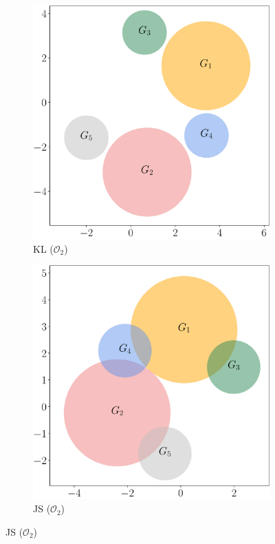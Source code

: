 \documentclass{article}
\begin{document}
\begin{figure}[t]
\begin{subfigure}[b]{.48\textwidth}
\includegraphics[width=\textwidth]{kl2}
\caption{KL ($\mathcal{O}_2$)}
\end{subfigure}
\begin{subfigure}[b]{.48\textwidth}
\includegraphics[width=\textwidth]{js2}
\caption{JS ($\mathcal{O}_2$)}
\end{subfigure}


\end{figure}
\end{document}
